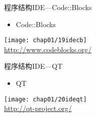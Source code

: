 \begin{frame}{程序结构}{IDE---Code::Blocks}
  \stretchon
  \begin{itemize}
  \item Code::Blocks
  \end{itemize}
  \centering
    \texttt{[image: chap01/19idecb]}\\
    \tiny
    \url{http://www.codeblocks.org/}
  \stretchoff
\end{frame}

\begin{frame}{程序结构}{IDE---QT}
  \stretchon
  \begin{itemize}
  \item QT
  \end{itemize}
  \centering
    \texttt{[image: chap01/20ideqt]}\\
    \tiny
    \url{http://qt-project.org/}
  \stretchoff
\end{frame}
  
  


